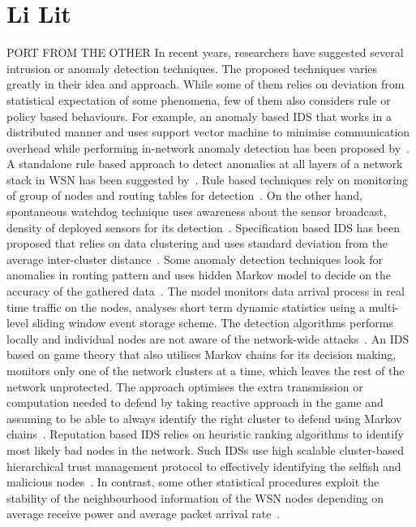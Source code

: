 \documentclass[conference]{IEEEtran}
\begin{document}
\section{Li Lit}PORT FROM THE OTHER
In recent years, researchers have suggested several intrusion or anomaly detection techniques. 
The proposed techniques varies greatly in their idea and approach.
While some of them relies on deviation from statistical expectation of some phenomena, few of them also considers rule or policy based behaviours.
For example, an anomaly based IDS that works in a distributed manner and uses support vector machine to minimise communication overhead while performing in-network anomaly detection has been proposed by~\cite{ISI:000257882502160}.
A standalone rule based approach to detect anomalies at all layers of a network stack in WSN has been suggested by~\cite{1515559}.
Rule based  techniques rely on monitoring of group of nodes and routing tables for detection~\cite{ISI:000298891500099, Chen:2009:NMI:1516241.1516282, 1424814, Strikos_afull}.
On the other hand, spontaneous watchdog technique uses awareness about the sensor broadcast, density of deployed sensors for its detection~\cite{1593102}.
Specification based  IDS has been proposed that relies on data clustering and uses standard deviation from the average inter-cluster distance~\cite{Chen:2009:NMI:1516241.1516282, 4085803}.
Some anomaly  detection techniques look for anomalies in routing pattern and uses  hidden Markov model to decide on the accuracy of the gathered data~\cite{1290173, 4024996}.%
The model monitors data arrival process in real time traffic on the nodes, analyses short term dynamic statistics using a multi-level sliding window event storage scheme. %
The detection algorithms performs locally and individual nodes are not aware of the network-wide attacks~\cite{1515559}.
An IDS based on game theory that also utilises Markov chains for its decision making, monitors only one of the network clusters at a time, which leaves the rest of the network unprotected.
The approach optimises the extra transmission or computation needed to defend by taking reactive approach in the game and assuming to be able to always identify the right cluster to defend using Markov chains~\cite{1347798, Das07preventingdos, Reddy:2009:GTA:1607720.1607944}.
Reputation based IDS relies on heuristic ranking algorithms to identify most likely bad nodes in the network.
Such IDSs use high scalable cluster-based hierarchical trust management protocol to effectively identifying the selfish and malicious nodes~\cite{6174485}.
In contrast, some other statistical procedures exploit the stability of the neighbourhood information of the WSN nodes depending on average receive power and average packet arrival rate~\cite{1512911}.
\end{document}

